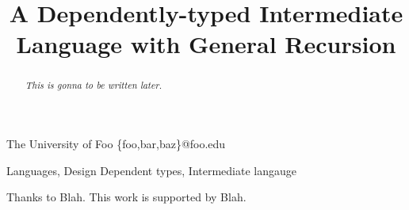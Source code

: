 \documentclass[preprint]{sigplanconf}
\begin{document}
\setlength{\pdfpageheight}{\paperheight}
\setlength{\pdfpagewidth}{\paperwidth}


\preprintfooter{} %

\title{A Dependently-typed Intermediate Language with General Recursion}
\subtitle{}

           {The University of Foo}
           {\{foo,bar,baz\}@foo.edu}

\maketitle

\begin{abstract}
\emph{This is gonna to be written later.}
\end{abstract}

\terms Languages, Design
\keywords Dependent types, Intermediate langauge



















\acks
Thanks to Blah. This work is supported by Blah.


\nocite{*}



\appendix


\end{document}
